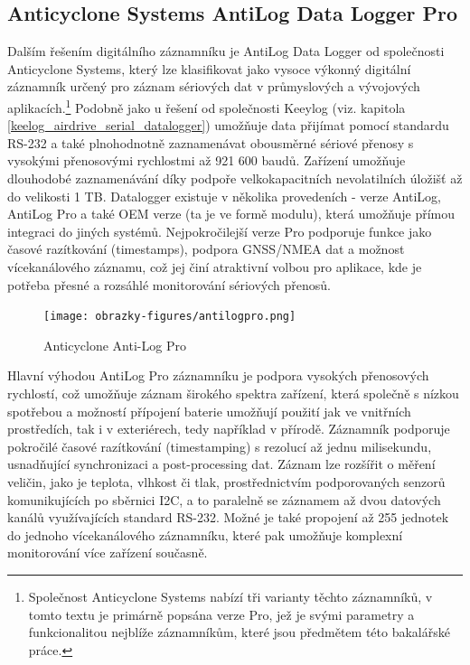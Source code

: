\subsection{Anticyclone Systems AntiLog Data Logger Pro}
\label{anticyclone_systems_antilog_data_logger}
Dalším řešením digitálního záznamníku je AntiLog Data Logger od společnosti Anticyclone Systems, který lze klasifikovat jako vysoce výkonný digitální záznamník určený pro záznam sériových dat v průmyslových a vývojových aplikacích.\footnote{Společnost Anticyclone Systems nabízí tři varianty těchto záznamníků, v tomto textu je primárně popsána verze Pro, jež je svými parametry a funkcionalitou nejblíže záznamníkům, které jsou předmětem této bakalářské práce.} Podobně jako u řešení od společnosti Keeylog (viz. kapitola \ref{keelog_airdrive_serial_datalogger}) umožňuje data přijímat pomocí standardu RS-232 a také plnohodnotně zaznamenávat obousměrné sériové přenosy s vysokými přenosovými rychlostmi až 921 600 baudů. Zařízení umožňuje dlouhodobé zaznamenávání díky podpoře velkokapacitních nevolatilních úložišť až do velikosti 1 TB. Datalogger existuje v několika provedeních - verze AntiLog, AntiLog Pro a také OEM verze (ta je ve formě modulu), která umožňuje přímou integraci do jiných systémů. Nejpokročilejší verze Pro podporuje funkce jako časové razítkování (timestamps), podpora GNSS/NMEA dat a možnost vícekanálového záznamu, což jej činí atraktivní volbou pro aplikace, kde je potřeba přesné a rozsáhlé monitorování sériových přenosů. \cite{anticyclone_systems_antilog_pro}

\begin{figure}[h]
    \centering
    \texttt{[image: obrazky-figures/antilogpro.png]}
    
    \caption{Anticyclone Anti-Log Pro \cite{anticyclone_systems_antilog_pro_price}}
    \label{fig:antilog-pro}
\end{figure}

Hlavní výhodou AntiLog Pro záznamníku je podpora vysokých přenosových rychlostí, což umožňuje záznam širokého spektra zařízení, která společně s nízkou spotřebou a možností přípojení baterie umožňují použití jak ve vnitřních prostředích, tak i v exteriérech, tedy například v přírodě. Záznamník podporuje pokročilé časové razítkování (timestamping) s rezolucí až jednu milisekundu, usnadňující synchronizaci a post-processing dat. Záznam lze rozšířit o měření veličin, jako je teplota, vlhkost či tlak, prostřednictvím podporovaných senzorů komunikujících po sběrnici I2C, a to paralelně se záznamem až dvou datových kanálů využívajících standard RS-232. Možné je také propojení až 255 jednotek do jednoho vícekanálového záznamníku, které pak umožňuje komplexní monitorování více zařízení současně. \cite{anticyclone_systems_antilog_pro, anticyclone_systems_antilog_pro_extended_logging}

